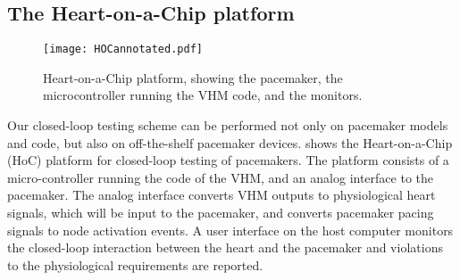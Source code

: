 \subsection{The Heart-on-a-Chip platform}
\label{HoC}

\begin{figure}[!t]
	\centering
	\texttt{[image: HOCannotated.pdf]}		
	\caption{\small Heart-on-a-Chip platform, showing the pacemaker, the microcontroller running the VHM code, and the monitors.}
	\label{fig:hoc}
\end{figure} 

Our closed-loop testing scheme can be performed not only on pacemaker models and code, but also on off-the-shelf pacemaker devices. 
 shows the Heart-on-a-Chip (HoC) platform for closed-loop testing of pacemakers. 
The platform consists of a micro-controller running the code of the VHM, and an analog interface to the pacemaker. 
The analog interface converts VHM outputs to physiological heart signals, which will be input to the pacemaker, and converts pacemaker pacing signals to node activation events.  
A user interface on the host computer monitors the closed-loop interaction between the heart and the pacemaker and violations to the physiological requirements are reported.
